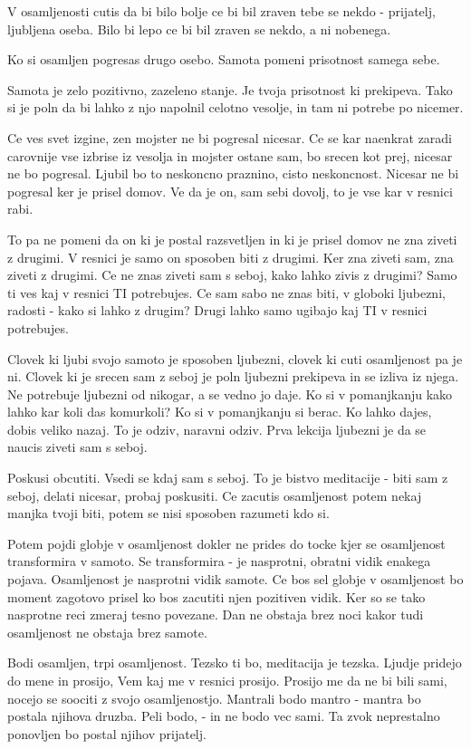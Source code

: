 V osamljenosti cutis da bi bilo bolje ce bi bil zraven tebe se nekdo - prijatelj, ljubljena oseba. Bilo bi lepo ce bi bil zraven se nekdo, a ni nobenega. 

Ko si osamljen pogresas drugo osebo. Samota pomeni prisotnost samega sebe. 

Samota je zelo pozitivno, zazeleno stanje. Je tvoja prisotnost ki prekipeva. Tako si je poln da bi lahko z njo napolnil celotno vesolje, in tam ni potrebe po nicemer. 

Ce ves svet izgine, zen mojster ne bi pogresal nicesar. Ce se kar naenkrat zaradi carovnije vse izbrise iz vesolja in mojster ostane sam, bo srecen kot prej, nicesar ne bo pogresal. Ljubil bo to neskoncno praznino, cisto neskoncnost. Nicesar ne bi pogresal ker je prisel domov. Ve da je on, sam sebi dovolj, to je vse kar v resnici rabi. 

To pa ne pomeni da on ki je postal razsvetljen in ki je prisel domov ne zna ziveti z drugimi. V resnici je samo on sposoben biti z drugimi. Ker zna ziveti sam, zna ziveti z drugimi. Ce ne znas ziveti sam s seboj, kako lahko zivis z drugimi? Samo ti ves kaj v resnici TI potrebujes. Ce sam sabo ne znas biti, v globoki ljubezni, radosti - kako si lahko z drugim? Drugi lahko samo ugibajo kaj TI v resnici potrebujes. 

Clovek ki ljubi svojo samoto je sposoben ljubezni, clovek ki cuti osamljenost pa je ni. Clovek ki je srecen sam z seboj je poln ljubezni prekipeva in se izliva iz njega. Ne potrebuje ljubezni od nikogar, a se vedno jo daje. Ko si v pomanjkanju kako lahko kar koli das komurkoli? Ko si v pomanjkanju si berac. Ko lahko dajes, dobis veliko nazaj. To je odziv, naravni odziv. Prva lekcija ljubezni je da se naucis ziveti sam s seboj. 

Poskusi obcutiti. Vsedi se kdaj sam s seboj. To je bistvo meditacije - biti sam z seboj, delati nicesar, probaj poskusiti. Ce zacutis osamljenost potem nekaj manjka tvoji biti, potem se nisi sposoben razumeti kdo si. 

Potem pojdi globje v osamljenost dokler ne prides do tocke kjer se osamljenost transformira v samoto. Se transformira - je nasprotni, obratni vidik enakega pojava. Osamljenost je nasprotni vidik samote. Ce bos sel globje v osamljenost bo moment zagotovo prisel ko bos zacutiti njen pozitiven vidik. Ker so se tako nasprotne reci zmeraj tesno povezane. Dan ne obstaja brez noci kakor tudi osamljenost ne obstaja brez samote. 

Bodi osamljen, trpi osamljenost. Tezsko ti bo, meditacija je tezska. Ljudje pridejo do mene in prosijo,  Vem kaj me v resnici prosijo. Prosijo me da ne bi bili sami, nocejo se soociti z svojo osamljenostjo. Mantrali bodo mantro - mantra bo postala njihova druzba. Peli bodo,  - in ne bodo vec sami. Ta zvok  neprestalno ponovljen bo postal njihov prijatelj. 

